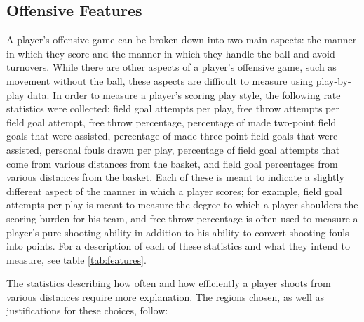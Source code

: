 \subsection{Offensive Features}

A player's offensive game can be broken down into two main aspects: the manner in
which they score and the manner in which they handle the ball and avoid turnovers.
While there are other aspects of a player's offensive game, such as movement without
the ball, these aspects are difficult to measure using play-by-play data. In order
to measure a player's scoring play style, the following rate statistics were
collected: field goal attempts per play, free throw attempts per field goal attempt,
free throw percentage, percentage of made two-point field goals that were assisted,
percentage of made three-point field goals that were assisted, personal fouls drawn
per play, percentage of field goal attempts that come from various distances from
the basket, and field goal percentages from various distances from the basket. Each
of these is meant to indicate a slightly different aspect of the manner in which a
player scores; for example, field goal attempts per play is meant to measure the
degree to which a player shoulders the scoring burden for his team, and free throw
percentage is often used to measure a player's pure shooting ability in addition to
his ability to convert shooting fouls into points. For a description of each of
these statistics and what they intend to measure, see table \ref{tab:features}.

The statistics describing how often and how efficiently a player shoots from various
distances require more explanation. The regions chosen, as well as justifications
for these choices, follow:

